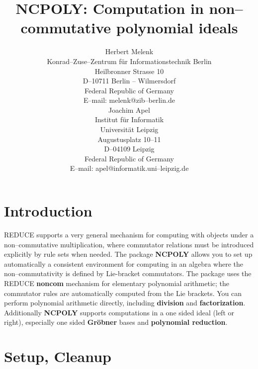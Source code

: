 \title{NCPOLY: Computation in non--commutative polynomial ideals}
\date{}
\author{
Herbert Melenk\\[0.05in]
Konrad--Zuse--Zentrum f\"ur Informationstechnik Berlin \\
Heilbronner Strasse 10 \\
D--10711 Berlin -- Wilmersdorf \\
Federal Republic of Germany \\[0.05in]
E--mail: melenk@zib--berlin.de \\[0.1in]
Joachim Apel\\[0.05in]
Institut f\"ur Informatik \\[0.05in]
Universit\"at Leipzig \\[0.05in]
Augustusplatz 10--11\\[0.05in]
D--04109 Leipzig \\[0.05in]
Federal Republic of Germany \\[0.05in]
E--mail: apel@informatik.uni--leipzig.de \\[0.05in]
}


\maketitle

\section{Introduction}

{\small REDUCE} supports a very general mechanism for computing
with objects under a non--commutative multiplication, where
commutator relations must be introduced explicitly by rule
sets when needed. The package {\bf NCPOLY} allows you to
set up automatically a consistent environment for computing in an algebra
where the non--commutativity is defined by Lie-bracket commutators.
The package uses the {\small REDUCE} {\bf noncom}
mechanism for elementary polynomial arithmetic; the commutator
rules are automatically computed from the Lie brackets.
You can perform polynomial arithmetic directly, including
{\bf division} and {\bf factorization}.
Additionally {\bf NCPOLY} supports computations in a one sided ideal (left or right),
especially one sided {\bf Gr\"obner} bases and {\bf polynomial reduction}.

\section{Setup, Cleanup}

